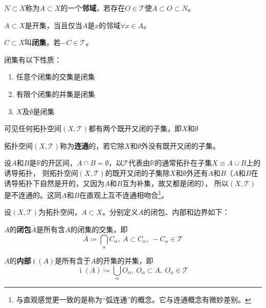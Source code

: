 \begin{definition}
	$N \subset X$称为$A \subset X$的一个\textbf{邻域}，若存在$O \in \mathscr{T}$使$A \subset O \subset N$。
\end{definition}

\begin{theorem}
	$A \subset X$是开集，当且仅当$A$是$x$的邻域$\forall x \in A$。
\end{theorem}

\begin{definition}
	$C \subset X$叫\textbf{闭集}，若$-C \in \mathscr{T}$。
\end{definition}

\begin{theorem}
	闭集有以下性质：
	\begin{enumerate}[（a）]
		\item 任意个闭集的交集是闭集
		\item 有限个闭集的并集是闭集
		\item $X$及$\emptyset$是闭集
	\end{enumerate}
\end{theorem}

可见任何拓扑空间$(X, \mathscr{T})$都有两个既开又闭的子集，即$X$和$\emptyset$

\begin{definition}
	拓扑空间$(X, \mathscr{T})$称为\textbf{连通}的，若它除$X$和$\emptyset$外没有既开又闭的子集。
\end{definition}

\begin{example}
	设$A$和$B$是$\mathbb{R}$的开区间，$A \cap B = \emptyset$，以$\mathscr{T}$代表由$\mathbb{R}$的通常拓扑在子集$X \equiv A \cup B$上的诱导拓扑，
	则拓扑空间$(X, \mathscr{T})$的既开又闭的子集除$X$和$\emptyset$外还有$A$和$B$（$A$和$B$在诱导拓扑下自然是开的，又因为$A$和$B$互为补集，故又都是闭的），
	所以$(X, \mathscr{T})$是不连通的。这同$A$和$B$在直观上互不连通相吻合\footnote{
		与直观感觉更一致的是称为``弧连通''的概念。它与连通概念有微妙差别。
	}。
\end{example}

设$(X, \mathscr{T})$为拓扑空间，$A \subset X$。分别定义$A$的闭包、内部和边界如下：

\begin{definition}
	$A$的\textbf{闭包}$\bar{A}$是所有含$A$的闭集的交集，即
	$$\bar{A} \coloneq \bigcap_\alpha C_\alpha, ~ A \subset C_\alpha, ~ -C_\alpha \in \mathscr{T}$$
\end{definition}

\begin{definition}
	$A$的\textbf{内部}$\operatorname{i}(A)$是所有含于$A$的开集的并集，即
	$$\operatorname{i}(A) \coloneq \bigcup_\alpha O_\alpha, ~ O_\alpha \subset A, ~ O_\alpha \in \mathscr{T}$$
\end{definition}

